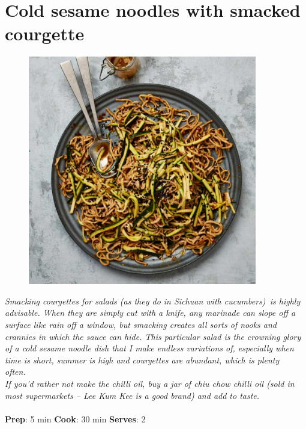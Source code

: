 \documentclass{book}
\begin{document}
\section{Cold sesame noodles with smacked courgette}
\begin{figure}
\centering\includegraphics[width=10cm,height=10cm,keepaspectratio]{Recipe_Pictures/Cold_sesame_noodles_with_smacked_courgette.png}
\end{figure}
\emph{Smacking courgettes for salads (as they do in Sichuan with cucumbers) is highly advisable. When they are simply cut with a knife, any marinade can slope off a surface like rain off a window, but smacking creates all sorts of nooks and crannies in which the sauce can hide. This particular salad is the crowning glory of a cold sesame noodle dish that I make endless variations of, especially when time is short, summer is high and courgettes are abundant, which is plenty often. \\ 
If you’d rather not make the chilli oil, buy a jar of chiu chow chilli oil (sold in most supermarkets – Lee Kum Kee is a good brand) and add to taste. }\\\\ 
\textbf{Prep}: 5 min
\textbf{Cook}: 30 min
\textbf{Serves}: 2
\end{document}
